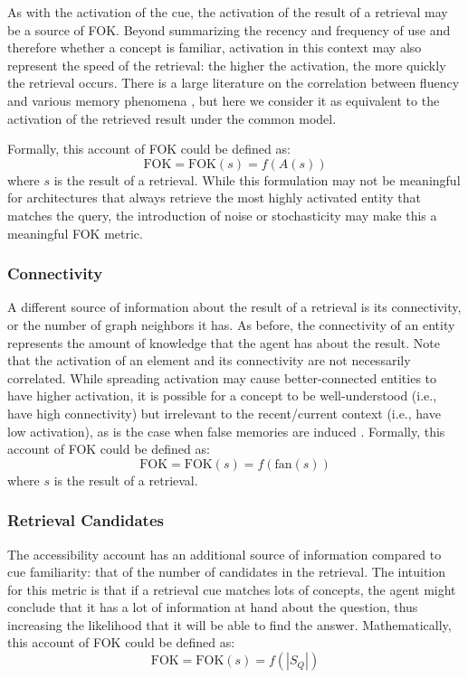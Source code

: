 \documentclass[10pt,letterpaper]{article}
\newcommand{\fok}[0]{\text{FOK}}
\begin{document}
As with the activation of the cue, the activation of the result of a retrieval may be a source of FOK.
Beyond summarizing the recency and frequency of use and therefore whether a concept is familiar, activation in this context may also represent the speed of the retrieval: the higher the activation, the more quickly the retrieval occurs.
There is a large literature on the correlation between fluency and various memory phenomena \cite{Alter2009UnitingTheTribes}, but here we consider it as equivalent to the activation of the retrieved result under the common model.

Formally, this account of FOK could be defined as:
$$\fok = \fok(s) = f(A(s))$$
where $s$ is the result of a retrieval.
While this formulation may not be meaningful for architectures that always retrieve the most highly activated entity that matches the query, the introduction of noise or stochasticity may make this a meaningful FOK metric.

\subsubsection{Connectivity}

A different source of information about the result of a retrieval is its connectivity, or the number of graph neighbors it has.
As before, the connectivity of an entity represents the amount of knowledge that the agent has about the result.
Note that the activation of an element and its connectivity are not necessarily correlated.
While spreading activation may cause better-connected entities to have higher activation, it is possible for a concept to be well-understood (i.e., have high connectivity) but irrelevant to the recent/current context (i.e., have low activation), as is the case when false memories are induced \cite{Li2016TowardsModelingFalse}.
Formally, this account of FOK could be defined as:
$$\fok = \fok(s) = f(\text{fan}(s))$$
where $s$ is the result of a retrieval.

\subsubsection{Retrieval Candidates}

The accessibility account has an additional source of information compared to cue familiarity: that of the number of candidates in the retrieval.
The intuition for this metric is that if a retrieval cue matches lots of concepts, the agent might conclude that it has a lot of information at hand about the question, thus increasing the likelihood that it will be able to find the answer.
Mathematically, this account of FOK could be defined as:
$$\fok = \fok(s) = f(|S_Q|)$$
\end{document}
